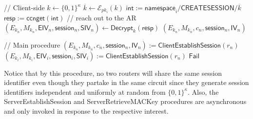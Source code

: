 \begin{algorithm}[ht!]
\begin{algorithmic}[1]
\EndFunction

 // Client-side
  \State $k \gets \{0,1\}^{\kappa}$
  \State $\overline{k} \gets \mathcal{E}_{pk_i}(k)$
  \State $\mathsf{int} := \mathsf{namespace}_i/\mathsf{CREATESESSION}/\overline{k}$
  \State $\mathsf{resp} := \mathsf{ccnget}(\mathsf{int})$ // reach out to the AR
  \State $(E_{k_n}, M_{k_n}, \mathsf{EIV}_n, \mathsf{session}_n, \mathsf{SIV}_n) \gets \mathsf{Decrypt}_{k}(\mathsf{resp})$
  \State \Return $(E_{k_n}, M_{k_n}, c_n, \mathsf{session}_n, \mathsf{IV}_n)$
\EndFunction


 // Main procedure
\State $(E_{k_n}, M_{k_n}, c_n, \mathsf{session}_n, \mathsf{IV}_n) := \mathsf{ClientEstablishSession}(r_n)$
  \State $(E_{k_i}, M_{k_i}, \mathsf{EIV}_i, \mathsf{session}_i, \mathsf{SIV}_i) := \mathsf{ClientEstablishSession}(r_n)$
    \State \Return $\mathsf{Fail}$
  \EndIf
\EndFor
\EndFunction

  \end{algorithmic}
\end{algorithm}

Notice that by this procedure, no two routers will share the same session identifier even though they partake in the same circuit since they generate session identifiers independent and uniformly at random from $\{0,1\}^{\kappa}$. Also, the {\sf ServerEstablishSession} and {\sf ServerRetrieveMACKey} procedures are asynchronous and only invoked in response to the respective interest.

